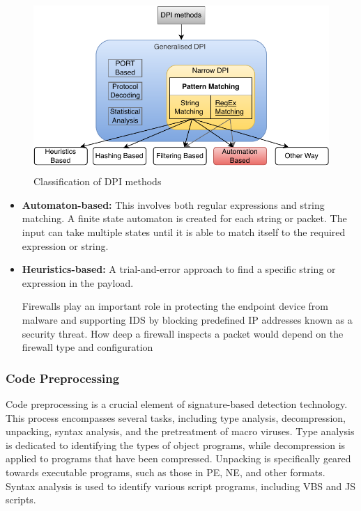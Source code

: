 \documentclass[12pt,letterpaper]{article}
\begin{document}
        \begin{figure}[h]
            \centering
            \includegraphics[height = 6.5cm]{images/classification.drawio.pdf}
            \caption{Classification of DPI methods}
            \label{fig:Classification of Methods DPI}
        \end{figure}

        \begin{itemize}
        
            \item \textbf{Automaton-based:} This involves both regular expressions and string matching. A finite state automaton is created for each string or packet. The input can take multiple states until it is able to match itself to the required expression or string.

            \item  \textbf{Heuristics-based:} A trial-and-error approach to find a specific string or expression in the payload.

           Firewalls play an important role in protecting the endpoint device from malware and supporting IDS by blocking predefined IP addresses known as a security threat. How deep a firewall inspects a packet would depend on the firewall type and configuration

        \end{itemize}

        \subsubsection{Code Preprocessing}

        Code preprocessing is a crucial element of signature-based detection technology. This process encompasses several tasks, including type analysis, decompression, unpacking, syntax analysis, and the pretreatment of macro viruses. Type analysis is dedicated to identifying the types of object programs, while decompression is applied to programs that have been compressed. Unpacking is specifically geared towards executable programs, such as those in PE, NE, and other formats. Syntax analysis is used to identify various script programs, including VBS and JS scripts.
\end{document}
